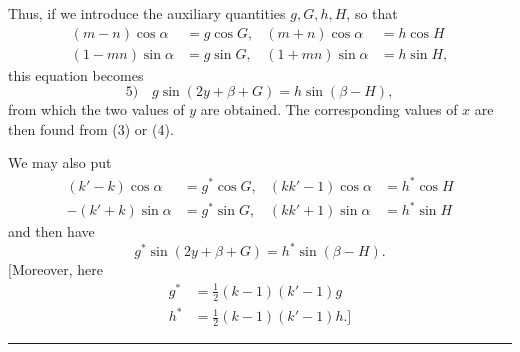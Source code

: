Thus, if we introduce the auxiliary quantities \(g,G,h,H\), so that
\[
\begin{aligned}
(m-n)\cos\alpha&=g\cos G, &(m+n)\cos\alpha&=h\cos H\\
(1-mn)\sin\alpha&=g\sin G, &(1+mn)\sin\alpha&=h\sin H,
\end{aligned}
\]
this equation becomes
\[
5)\quad g\sin(2y+\beta+G)=h\sin(\beta-H),
\]
from which the two values of \(y\) are obtained. The corresponding values of \(x\) are then found from (3) or (4).

We may also put
\[
\begin{aligned}
(k'-k)\cos\alpha&=g^*\cos G, &(kk'-1)\cos\alpha&=h^*\cos H\\
-(k'+k)\sin\alpha&=g^*\sin G, &(kk'+1)\sin\alpha&=h^*\sin H
\end{aligned}
\]
and then have
\[
g^*\sin(2y+\beta+G)=h^*\sin(\beta-H).
\]
[Moreover, here
\[
\begin{aligned}
g^*&=\tfrac12(k-1)(k'-1)g\\
h^*&=\tfrac12(k-1)(k'-1)h.]
\end{aligned}
\]
\begin{center}\rule{.18\textwidth}{.35pt}\end{center}
